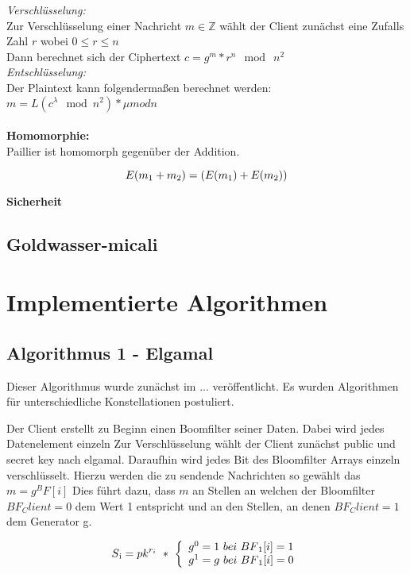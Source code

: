 \textit{Verschlüsselung:}\\
Zur Verschlüsselung einer Nachricht $ m \in \mathbb{Z} $ wählt der Client zunächst eine Zufalls Zahl $ r $ wobei $ 0 \leq r \leq n $\\
Dann berechnet sich der Ciphertext $ c = g^{m}*r^{n} \mod\ n^{2} $\\
\textit{Entschlüsselung:}\\
Der Plaintext kann folgendermaßen berechnet werden: $ m = L(c^{\lambda} \mod n^{2}) * \mu mod n $\\
\\
\textbf{Homomorphie:}\\
Paillier ist homomorph gegenüber der Addition.

$$ E(m \textsubscript{1} + m \textsubscript{2}) = (E(m \textsubscript{1}) + E(m \textsubscript{2}))$$

\textbf{Sicherheit}\\
 

\subsection{Goldwasser-micali}
\label{sec:Sec1.3.3}

\section{Implementierte Algorithmen}

\subsection{Algorithmus 1 - Elgamal}

Dieser Algorithmus wurde zunächst im ... veröffentlicht. Es wurden Algorithmen für unterschiedliche Konstellationen postuliert. 

Der Client erstellt zu Beginn einen Boomfilter seiner Daten. Dabei wird jedes Datenelement einzeln 
Zur Verschlüsselung wählt der Client zunächst public und secret key nach elgamal.
Daraufhin wird jedes Bit des Bloomfilter Arrays einzeln verschlüsselt.
Hierzu werden die zu sendende Nachrichten so gewählt das $m = g^BF[i]$
Dies führt dazu, dass $ m $ an Stellen an welchen der Bloomfilter $ BF_Client = 0 $  dem Wert 1  entspricht und an den Stellen, an denen $ BF_Client = 1 $ dem Generator g.

\[
S\textsubscript{i} = pk^{r_{i}} \ * \ \left\{
\begin{array}{ll}
g^{0} = 1 \ bei \  BF\textsubscript{1}[i]=1\\
g^{1} = g \ bei \ BF\textsubscript{1}[i]=0\\
\end{array}
\right.
\]

